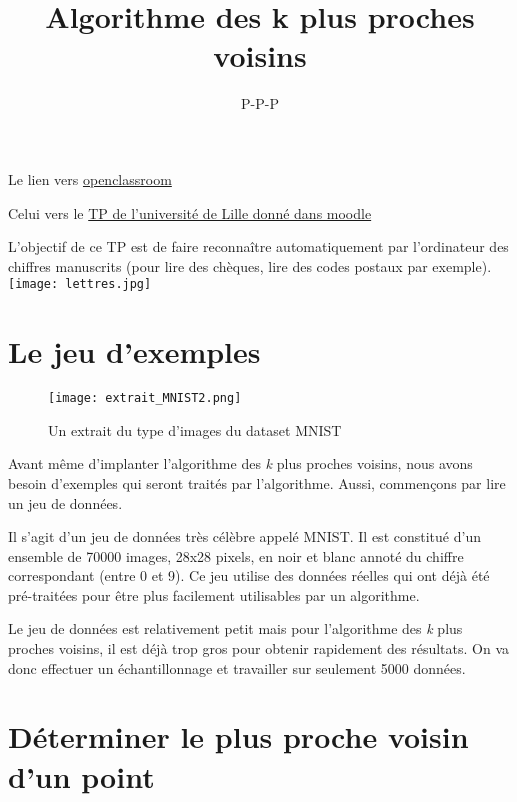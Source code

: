 \documentclass[10pt,lang=french]{scrartcl}
\title{Algorithme des k plus proches voisins}
\author{P-P-P}
\begin{document}
    
    
    \maketitle


Le lien vers
\href{https://openclassrooms.com/fr/courses/4011851-initiez-vous-au-machine-learning/4022441-tp-entrainez-le-modele-des-k-plus-proches-voisins-k-nn}{openclassroom}

Celui vers le
\href{http://www.grappa.univ-lille3.fr/~ppreux/ensg/miashs/l3-ap/tps/kppv/}{TP
de l'université de Lille donné dans moodle}

L'objectif de ce TP est de faire reconnaître automatiquement par
l'ordinateur des chiffres manuscrits (pour lire des chèques, lire des
codes postaux par exemple). \texttt{[image: lettres.jpg]}

    \tableofcontents
    
\section{Le  jeu d'exemples}

    \begin{wrapfigure}{r}{0.4\textwidth}
    	\centering
    		\texttt{[image: extrait\_MNIST2.png]}
    		\caption{\scriptsize Un extrait du type d'images du dataset MNIST}
    \end{wrapfigure}
    
    Avant même d'implanter l'algorithme des \emph{k} plus proches voisins,
    nous avons besoin d'exemples qui seront traités par l'algorithme. Aussi,
    commençons par lire un jeu de données.
    
    Il s'agit d'un jeu de données très célèbre appelé MNIST. Il est
    constitué d'un ensemble de 70000 images, 28x28 pixels, en noir et blanc
    annoté du chiffre correspondant (entre 0 et 9). Ce jeu utilise des
    données réelles qui ont déjà été pré-traitées pour être plus facilement
    utilisables par un algorithme.
    
    
    Le jeu de données est relativement petit mais pour l'algorithme des
    \emph{k} plus proches voisins, il est déjà trop gros pour obtenir
    rapidement des résultats. On va donc effectuer un échantillonnage et
    travailler sur seulement 5000 données.


\section{Déterminer le plus proche voisin d'un point}
\end{document}
